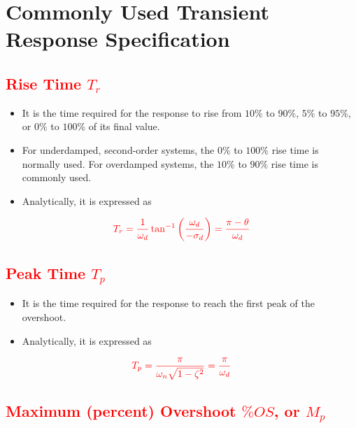 \documentclass[
  14pt,
  a4paper,
  oneside,
  open=any,
  a4paper,
  14pt]{report}
\begin{document}
\section{Commonly Used Transient Response
Specification}\label{commonly-used-transient-response-specification}

\subsection{\texorpdfstring{\textcolor{red}{Rise Time
\(T_r\)}}{Rise Time T\_r}}\label{rise-time-t_r-1}

\begin{itemize}
\item
  It is the time required for the response to rise from \(10\%\) to
  \(90\%\), \(5\%\) to \(95\%\), or \(0\%\) to \(100\%\) of its final
  value.
\item
  For underdamped, second-order systems, the \(0\%\) to \(100\%\) rise
  time is normally used. For overdamped systems, the \(10\%\) to
  \(90\%\) rise time is commonly used.
\item
  Analytically, it is expressed as
\end{itemize}

\[
    \textcolor{red}{T_r = \dfrac{1}{\omega_d} \tan^{-1}\left(\dfrac{\omega_d}{-\sigma_d} \right) = \dfrac{\pi - \theta}{\omega_d}}
\]

\subsection{\texorpdfstring{\textcolor{red}{Peak Time
\(T_p\)}}{Peak Time T\_p}}\label{peak-time-t_p}

\begin{itemize}
\item
  It is the time required for the response to reach the first peak of
  the overshoot.
\item
  Analytically, it is expressed as
\end{itemize}

\[
    \textcolor{red}{T_p = \dfrac{\pi}{\omega_n \sqrt{1-\zeta^2}} = \dfrac{\pi}{\omega_d}}
\]

\subsection{\texorpdfstring{\textcolor{red}{Maximum (percent) Overshoot
\(\%OS\), or
\(M_p\)}}{Maximum (percent) Overshoot \textbackslash\%OS, or M\_p}}\label{maximum-percent-overshoot-os-or-m_p}
\end{document}
